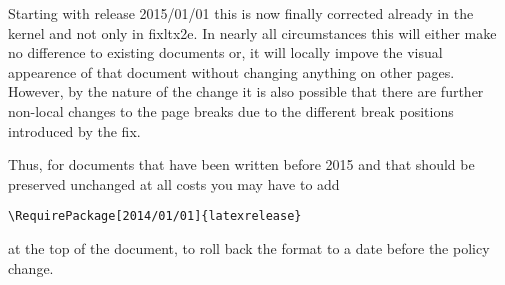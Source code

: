 \documentclass{ltnews}
\begin{document}
Starting with release 2015/01/01 this is now finally corrected already
in the kernel and not only in \textsf{fixltx2e}.  In nearly all
circumstances this will either make no difference to existing
documents or, it will locally impove the visual appearence of that
document without changing anything on other pages.  However, by the
nature of the change it is also possible that there are further
non-local changes to the page breaks due to the different break
positions introduced by the fix.

Thus, for documents that have been written before 2015 and that should
be preserved unchanged at all costs you may have to add
\begin{verbatim}
\RequirePackage[2014/01/01]{latexrelease}
\end{verbatim}
at the top of the document, to roll back the format to a date before
the policy change.
\end{document}
